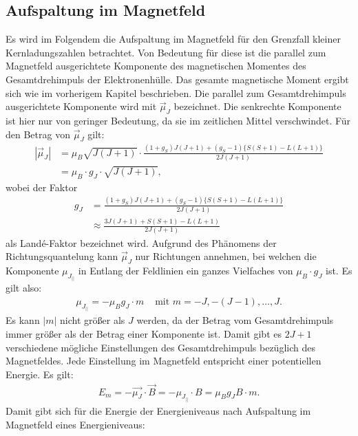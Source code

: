 \subsection{Aufspaltung im Magnetfeld}
Es wird im Folgendem die Aufspaltung im Magnetfeld für den Grenzfall kleiner Kernladungszahlen betrachtet. Von Bedeutung für diese ist die parallel zum Magnetfeld ausgerichtete Komponente des magnetischen Momentes des Gesamtdrehimpuls der Elektronenhülle. Das gesamte magnetische Moment ergibt sich wie im vorherigem Kapitel beschrieben. Die parallel zum Gesamtdrehimpuls ausgerichtete Komponente wird mit $\vec{\mu}_J$ bezeichnet. Die senkrechte Komponente ist hier nur von geringer Bedeutung, da sie im zeitlichen Mittel verschwindet. Für den Betrag von $\vec{\mu}_J$ gilt:
\begin{equation} 
	\begin{split}
	|\vec{\mu}_J|&=\mu_B \sqrt{J(J+1)} \cdot \frac{(1+g_S) J (J+1) + (g_S-1)\{S(S+1)-L(L+1)\}}{2 J (J+1)}\\
	&= \mu_B\cdot g_J \cdot\sqrt{J(J+1)},
	\end{split}
\end{equation}
wobei der Faktor 
\begin{equation} \label{eq:LandeFaktor}
	\begin{split}
		g_J&=\frac{(1+g_S) J (J+1) + (g_S-1)\{S(S+1)-L(L+1)\}}{2 J (J+1)}\\
		&\approx \frac{3 J (J+1) + S(S+1)-L(L+1)}{2 J (J+1)}
	\end{split}
\end{equation}
als Landé-Faktor bezeichnet wird. Aufgrund des Phänomens der Richtungsquantelung kann $\vec{\mu}_J$ nur Richtungen annehmen, bei welchen die Komponente $\mu_{J_{||}}$ in Entlang der Feldlinien ein ganzes Vielfaches von $\mu_B \cdot g_J$ ist. Es gilt also:
\begin{align}
	\mu_{J_{||}}=-\mu_B g_J  \cdot m & \text{ mit } m=-J,-(J-1), \hdots, J.
\end{align}
Es kann $|m|$ nicht größer als $J$ werden, da der Betrag vom Gesamtdrehimpuls immer größer als der Betrag einer Komponente ist. Damit gibt es $2 J +1 $ verschiedene mögliche Einstellungen des Gesamtdrehimpuls bezüglich des Magnetfeldes. Jede Einstellung im Magnetfeld entspricht einer potentiellen Energie. Es gilt:
\begin{gather}
	E_{m}=-\vec{\mu_{J}} \cdot \vec{B} = -\mu_{J_{||}} \cdot B= \mu_B g_J B \cdot m.
\end{gather}
Damit gibt sich für die Energie der Energieniveaus nach Aufspaltung im Magnetfeld eines Energieniveaus:

